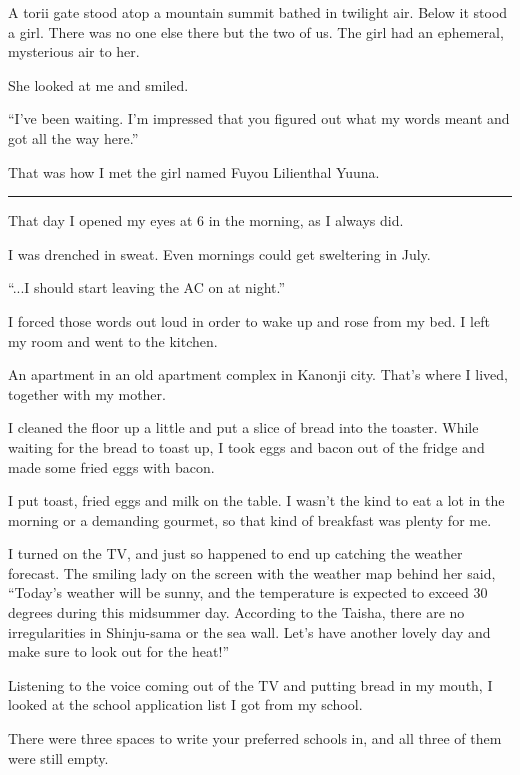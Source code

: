 


A torii gate stood atop a mountain summit bathed in twilight air. Below it stood a girl. There was no one else there but the two of us. The girl had an ephemeral, mysterious air to her.

She looked at me and smiled.

``I've been waiting. I'm impressed that you figured out what my words meant and got all the way here.''

That was how I met the girl named Fuyou Lilienthal Yuuna.

\vspace{\baselineskip}
\hrule
\vspace{\baselineskip}

That day I opened my eyes at 6 in the morning, as I always did.

I was drenched in sweat. Even mornings could get sweltering in July.

``...I should start leaving the AC on at night.''

I forced those words out loud in order to wake up and rose from my bed. I left my room and went to the kitchen.

An apartment in an old apartment complex in Kanonji city. That's where I lived, together with my mother.

I cleaned the floor up a little and put a slice of bread into the toaster. While waiting for the bread to toast up, I took eggs and bacon out of the fridge and made some fried eggs with bacon.

I put toast, fried eggs and milk on the table. I wasn't the kind to eat a lot in the morning or a demanding gourmet, so that kind of breakfast was plenty for me.

I turned on the TV, and just so happened to end up catching the weather forecast. The smiling lady on the screen with the weather map behind her said, ``Today's weather will be sunny, and the temperature is expected to exceed 30 degrees during this midsummer day. According to the Taisha, there are no irregularities in Shinju-sama or the sea wall. Let's have another lovely day and make sure to look out for the heat!''

Listening to the voice coming out of the TV and putting bread in my mouth, I looked at the school application list I got from my school.

There were three spaces to write your preferred schools in, and all three of them were still empty.

